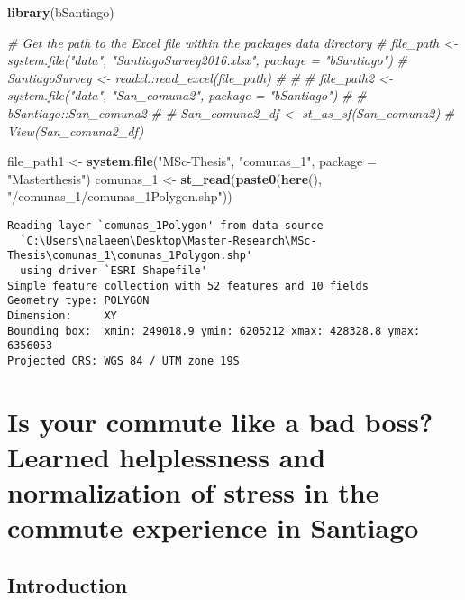\documentclass[
11pt, %
oneside, %
english, %
singlespacing, %
]{macthesis} %
\newenvironment{Shaded}{\begin{snugshade}}{\end{snugshade}}
\newcommand{\AttributeTok}[1]{\textcolor[rgb]{0.13,0.29,0.53}{#1}}
\newcommand{\CommentTok}[1]{\textcolor[rgb]{0.56,0.35,0.01}{\textit{#1}}}
\newcommand{\FunctionTok}[1]{\textcolor[rgb]{0.13,0.29,0.53}{\textbf{#1}}}
\newcommand{\NormalTok}[1]{#1}
\newcommand{\OtherTok}[1]{\textcolor[rgb]{0.56,0.35,0.01}{#1}}
\newcommand{\StringTok}[1]{\textcolor[rgb]{0.31,0.60,0.02}{#1}}
\begin{document}
\begin{Shaded}
\begin{Highlighting}[]
\FunctionTok{library}\NormalTok{(bSantiago)}

\CommentTok{\# Get the path to the Excel file within the package\textquotesingle{}s data directory}
\CommentTok{\# file\_path \textless{}{-} system.file("data", "SantiagoSurvey2016.xlsx", package = "bSantiago")}
\CommentTok{\# SantiagoSurvey \textless{}{-} readxl::read\_excel(file\_path)}
\CommentTok{\# }
\CommentTok{\# }
\CommentTok{\# file\_path2 \textless{}{-} system.file("data", "San\_comuna2", package = "bSantiago")}
\CommentTok{\# }
\CommentTok{\# bSantiago::San\_comuna2}
\CommentTok{\# }
\CommentTok{\# San\_comuna2\_df \textless{}{-} st\_as\_sf(San\_comuna2)}
\CommentTok{\# View(San\_comuna2\_df)}

\NormalTok{file\_path1 }\OtherTok{\textless{}{-}} \FunctionTok{system.file}\NormalTok{(}\StringTok{"MSc{-}Thesis"}\NormalTok{, }\StringTok{"comunas\_1"}\NormalTok{, }\AttributeTok{package =} \StringTok{"Masterthesis"}\NormalTok{)}
\NormalTok{comunas\_1 }\OtherTok{\textless{}{-}} \FunctionTok{st\_read}\NormalTok{(}\FunctionTok{paste0}\NormalTok{(}\FunctionTok{here}\NormalTok{(), }\StringTok{"/comunas\_1/comunas\_1Polygon.shp"}\NormalTok{))}
\end{Highlighting}
\end{Shaded}
\begin{verbatim}
Reading layer `comunas_1Polygon' from data source 
  `C:\Users\nalaeen\Desktop\Master-Research\MSc-Thesis\comunas_1\comunas_1Polygon.shp' 
  using driver `ESRI Shapefile'
Simple feature collection with 52 features and 10 fields
Geometry type: POLYGON
Dimension:     XY
Bounding box:  xmin: 249018.9 ymin: 6205212 xmax: 428328.8 ymax: 6356053
Projected CRS: WGS 84 / UTM zone 19S
\end{verbatim}
\hypertarget{is-your-commute-like-a-bad-boss-learned-helplessness-and-normalization-of-stress-in-the-commute-experience-in-santiago}{%
\chapter{Is your commute like a bad boss? Learned helplessness and normalization of stress in the commute experience in Santiago}\label{is-your-commute-like-a-bad-boss-learned-helplessness-and-normalization-of-stress-in-the-commute-experience-in-santiago}}

\hypertarget{introduction-3}{%
\section{Introduction}\label{introduction-3}}
\end{document}
